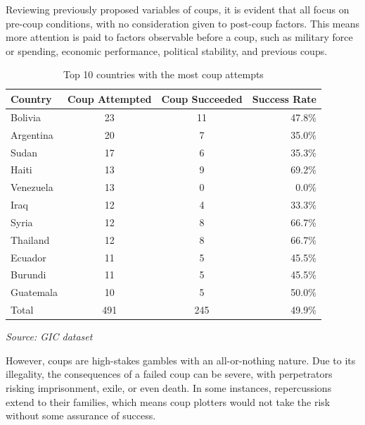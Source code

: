\documentclass[
  12pt,
]{report}
\begin{document}
Reviewing previously proposed variables of coups, it is evident that all
focus on pre-coup conditions, with no consideration given to post-coup
factors. This means more attention is paid to factors observable before
a coup, such as military force or spending, economic performance,
political stability, and previous coups.

\begingroup
\setlength{}
\setlength{}\fontsize{12.0pt}{14.4pt}\selectfont
\setlength{\LTpost}{0mm}

\begin{longtable}{@{\extracolsep{\fill}}lccr}

\caption{\label{tbl-coups}Top 10 countries with the most coup attempts}

\tabularnewline

\toprule
Country & Coup Attempted & Coup Succeeded & Success Rate \\ 
\midrule\addlinespace[2.5pt]
Bolivia & 23 & 11 & 47.8\% \\ 
Argentina & 20 & 7 & 35.0\% \\ 
Sudan & 17 & 6 & 35.3\% \\ 
Haiti & 13 & 9 & 69.2\% \\ 
Venezuela & 13 & 0 & 0.0\% \\ 
Iraq & 12 & 4 & 33.3\% \\ 
Syria & 12 & 8 & 66.7\% \\ 
Thailand & 12 & 8 & 66.7\% \\ 
Ecuador & 11 & 5 & 45.5\% \\ 
Burundi & 11 & 5 & 45.5\% \\ 
Guatemala & 10 & 5 & 50.0\% \\ 
Total & 491 & 245 & 49.9\% \\ 
\bottomrule

\end{longtable}

\begin{minipage}{\linewidth}
\emph{Source: GIC dataset}\\
\end{minipage}
\endgroup

However, coups are high-stakes gambles with an all-or-nothing nature.
Due to its illegality, the consequences of a failed coup can be severe,
with perpetrators risking imprisonment, exile, or even death. In some
instances, repercussions extend to their families, which means coup
plotters would not take the risk without some assurance of success.
\end{document}
